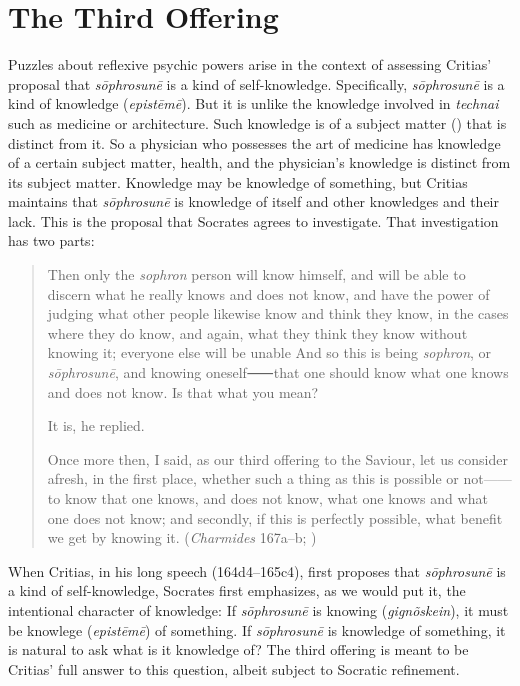 
\section{The Third Offering} %
\label{sec:the_third_offering}

Puzzles about reflexive psychic powers arise in the context of assessing Critias' proposal that \emph{sōphrosunē} is a kind of self-knowledge. Specifically, \emph{sōphrosunē} is a kind of knowledge (\emph{epistēmē}). But it is unlike the knowledge involved in \emph{technai} such as medicine or architecture. Such knowledge is of a subject matter () that is distinct from it. So a physician who possesses the art of medicine has knowledge of a certain subject matter, health, and the physician's knowledge is distinct from its subject matter. Knowledge may be knowledge of something, but Critias maintains that \emph{sōphrosunē} is knowledge of itself and other knowledges and their lack. This is the proposal that Socrates agrees to investigate. That investigation has two parts:

\begin{quotation}
	Then only the \emph{sophron} person will know himself, and will be able to discern what he really knows and does not know, and have the power of judging what other people likewise know and think they know, in the cases where they do know, and again, what they think they know without knowing it; everyone else will be unable And so this is being \emph{sophron}, or \emph{sōphrosunē}, and knowing oneself⸺that one should know what one knows and does not know. Is that what you mean?
	
	It is, he replied.
	
	Once more then, I said, as our third offering to the Saviour, let us consider afresh, in the first place, whether such a thing as this is possible or not——to know that one knows, and does not know, what one knows and what one does not know; and secondly, if this is perfectly possible, what benefit we get by knowing it. (\emph{Charmides} 167a–b; \citealt[57]{Lamb:1927qw})
\end{quotation}

When Critias, in his long speech (164d4–165c4), first proposes that \emph{sōphrosunē} is a kind of self-knowledge, Socrates first emphasizes, as we would put it, the intentional character of knowledge: If \emph{sōphrosunē} is knowing (\emph{gignõskein}), it must be knowlege (\emph{epistēmē}) of something. If \emph{sōphrosunē} is knowledge of something, it is natural to ask what is it knowledge of? The third offering is meant to be Critias' full answer to this question, albeit subject to Socratic refinement.

